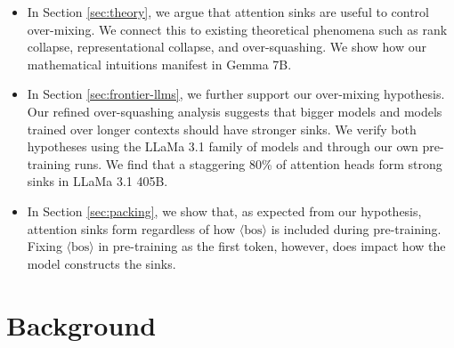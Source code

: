 \documentclass{article} %
\newcommand{\bos}{\ensuremath{\langle\text{bos}\rangle}\xspace}
\begin{document}
\begin{itemize}
    \setlength{\itemsep}{0.4pt} 
    \setlength{\parskip}{0pt}
    \item In Section \ref{sec:theory}, we argue that attention sinks are useful to control over-mixing. We connect this to existing theoretical phenomena such as rank collapse, representational collapse, and over-squashing. We show how our mathematical intuitions manifest in Gemma 7B.

    \item In Section \ref{sec:frontier-llms}, we further support our over-mixing hypothesis. Our refined over-squashing analysis suggests that bigger models and models trained over longer contexts should have stronger sinks. We verify both hypotheses using the LLaMa 3.1 family of models and through our own pre-training runs. We find that a staggering 80\% of attention heads form strong sinks in LLaMa 3.1 405B. 

    \item In Section \ref{sec:packing}, we show that, as expected from our hypothesis, attention sinks form regardless of how \bos is included during pre-training. Fixing \bos in pre-training as the first token, however, does impact how the model  constructs the sinks.
\end{itemize}

\section{Background}
\end{document}
